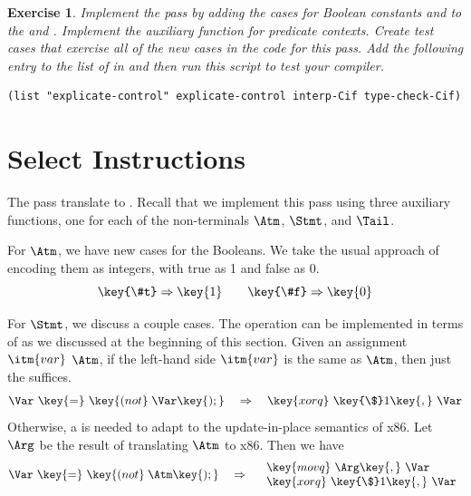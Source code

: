 \documentclass[11pt]{book}
\newtheorem{exercise}[theorem]{Exercise}
\begin{document}
\begin{exercise}\normalfont
Implement the pass  by adding the cases for
Boolean constants and  to the  and
. Implement the auxiliary function
 for predicate contexts.
%
Create test cases that exercise all of the new cases in the code for
this pass.
%
Add the following entry to the list of  in
 and then run this script to test your compiler.
\begin{lstlisting}
(list "explicate-control" explicate-control interp-Cif type-check-Cif)
\end{lstlisting}

\end{exercise}


\section{Select Instructions}
\label{sec:select-Rif}

The  pass translate \LangCIf{} to
\LangXIfVar{}. Recall that we implement this pass using three
auxiliary functions, one for each of the non-terminals $\Atm$,
$\Stmt$, and $\Tail$.

For $\Atm$, we have new cases for the Booleans.  We take the usual
approach of encoding them as integers, with true as 1 and false as 0.
\[
\key{\#t} \Rightarrow \key{1}
\qquad
\key{\#f} \Rightarrow \key{0}
\]

For $\Stmt$, we discuss a couple cases.  The  operation can
be implemented in terms of  as we discussed at the
beginning of this section. Given an assignment
$\itm{var}$ \key{=}  $\Atm$\key{);},
if the left-hand side $\itm{var}$ is
the same as $\Atm$, then just the  suffices.
\[
\Var~\key{=}~ \key{(not}\; \Var\key{);}
\quad\Rightarrow\quad
\key{xorq}~\key{\$}1\key{,}~\Var
\]
Otherwise, a  is needed to adapt to the update-in-place
semantics of x86. Let $\Arg$ be the result of translating $\Atm$ to
x86. Then we have
\[
\Var~\key{=}~ \key{(not}\; \Atm\key{);}
\quad\Rightarrow\quad
\begin{array}{l}
\key{movq}~\Arg\key{,}~\Var\\
\key{xorq}~\key{\$}1\key{,}~\Var
\end{array}
\]
\end{document}
